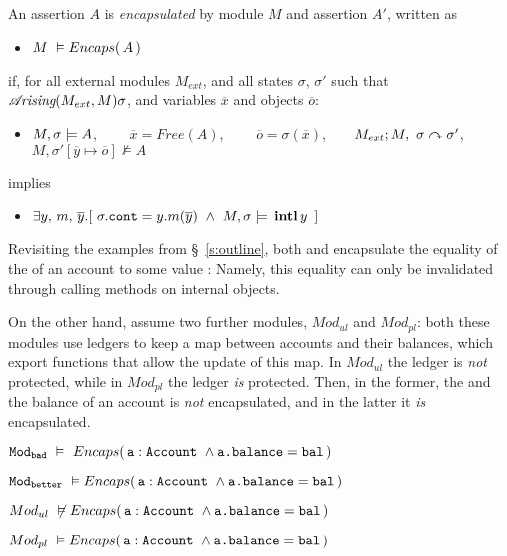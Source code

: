 \begin{definition}
\label{def:encapsulation}
An assertion $A$ is \emph{encapsulated} by module $M$ and assertion $A'$, written as
\begin{itemize}
 \item     $M\ \vDash {\ensuremath Encaps(\, A\, )}$
 \end{itemize}
if, for all external modules $M_{ext}$, and all states $\sigma$, $\sigma'$
such that $\mathcal{A}\!\textit{rising}(M_{ext}, M){\sigma}$, {and variables $\overline{x}$ and objects $\overline{o}$}:

\begin{itemize}
 \item
  $M , \sigma \models A$,  \ \ \ \   $\overline{x}=Free(A)$, \  \  \ \ $\overline{o}=\sigma(\overline{x})$,\ \ \ \ $M_{ext} ; M,\ \sigma \curvearrowright \sigma'$, \ \ \ ${M},{\sigma'[\overline{y}\mapsto{\overline{o}}]}\not\vDash{A}$
 \end{itemize}

implies

 \begin{itemize}
 \item   $\exists y,\,m,\, \overline{y} .[\ \sigma.\prg{cont}= y.m(\overline{y})\ \wedge\  \satisfiesA{M}{\sigma}{\internal{y}} \ ]
$
 \end{itemize}
\end{definition}

Revisiting the examples from \S~\ref{s:outline}, %
both \ModB and \ModC encapsulate   the  equality of the  of an account to some value : 
Namely, this equality can only be invalidated through calling  methods on internal objects.
 
{On the other hand, assume two further modules, $Mod_{ul}$ and $Mod_{pl}$: both these modules use ledgers to keep a map between accounts and their balances, which export functions that allow the update of this map. In $Mod_{ul}$ the ledger is \emph{not} protected, while in $Mod_{pl}$ the ledger \emph{is} protected. Then, in the former, the and the balance of an account is \emph{not} encapsulated, and in the latter it  \emph{is} encapsulated. } 
%
\\
\strut \hspace{1cm}
${\texttt{Mod}}_{{\texttt{bad}}}\ \vDash\ {Encaps(\,  {\texttt{a}}:{\texttt{Account}}\ \wedge {\texttt{a.balance}}={\texttt{bal}}\, )}$
\\
\strut \hspace{1cm}
${\texttt{Mod}}_{{\texttt{better}}}\ \vDash {\ensuremath Encaps(\,  {\texttt{a}}:{\texttt{Account}}\ \wedge {\texttt{a.balance}}={\texttt{bal}}\, )}$
\\
\strut \hspace{1cm} {$Mod_{ul}\ \not\vDash {\ensuremath Encaps(\,  {\texttt{a}}:{\texttt{Account}}\ \wedge {\texttt{a.balance}}={\texttt{bal}}\, )}$}
\\
\strut \hspace{1cm} {$Mod_{pl}\  \vDash {\ensuremath Encaps(\,  {\texttt{a}}:{\texttt{Account}}\ \wedge {\texttt{a.balance}}={\texttt{bal}}\, )}$}

